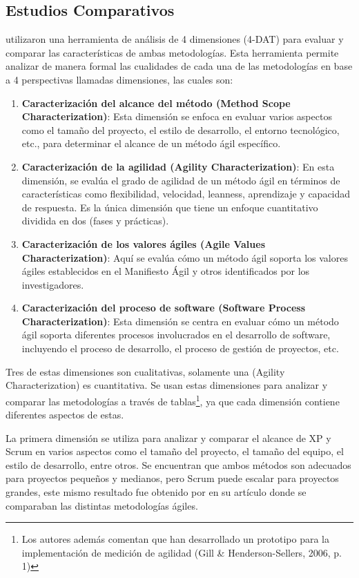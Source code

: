 \documentclass[a4paper,10pt]{article}
\begin{document}
	\subsection{Estudios Comparativos}
	\textcite{Gill_Henderson-Sellers_2006} utilizaron una herramienta de análisis de 4 dimensiones (4-DAT) para evaluar y comparar las características de ambas metodologías. Esta herramienta permite analizar de manera formal las cualidades de cada una de las metodologías en base a 4 perspectivas llamadas dimensiones, las cuales son:
	\begin{enumerate}
		\item \textbf{Caracterización del alcance del método (Method Scope Characterization)}: Esta dimensión se enfoca en evaluar varios aspectos como el tamaño del proyecto, el estilo de desarrollo, el entorno tecnológico, etc., para determinar el alcance de un método ágil específico.
		\item \textbf{Caracterización de la agilidad (Agility Characterization)}: En esta dimensión, se evalúa el grado de agilidad de un método ágil en términos de características como flexibilidad, velocidad, leanness, aprendizaje y capacidad de respuesta. Es la única dimensión que tiene un enfoque cuantitativo dividida en dos (fases y prácticas).
		\item \textbf{Caracterización de los valores ágiles (Agile Values Characterization)}: Aquí se evalúa cómo un método ágil soporta los valores ágiles establecidos en el Manifiesto Ágil y otros identificados por los investigadores.
		\item \textbf{Caracterización del proceso de software (Software Process Characterization)}: Esta dimensión se centra en evaluar cómo un método ágil soporta diferentes procesos involucrados en el desarrollo de software, incluyendo el proceso de desarrollo, el proceso de gestión de proyectos, etc.
	\end{enumerate}
	Tres de estas dimensiones son cualitativas, solamente una (Agility Characterization) es cuantitativa. Se usan estas dimensiones para analizar y comparar las metodologías a través de tablas\footnote{Los autores además comentan que han desarrollado un prototipo para la implementación de medición de agilidad (Gill \& Henderson-Sellers, 2006, p. 1)}, ya que cada dimensión contiene diferentes aspectos de estas.
	
	La primera dimensión se utiliza para analizar y comparar el alcance de XP y Scrum en varios aspectos como el tamaño del proyecto, el tamaño del equipo, el estilo de desarrollo, entre otros. Se encuentran que ambos métodos son adecuados para proyectos pequeños y medianos, pero Scrum puede escalar para proyectos grandes, este mismo resultado fue obtenido por \textcite{quinonez2017analisis} en su artículo donde se comparaban las distintas metodologías ágiles.
	
\end{document}
